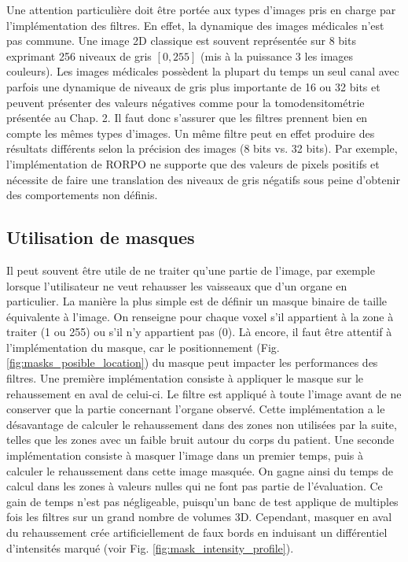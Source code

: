 Une attention particulière doit être portée aux types d'images pris en charge par l'implémentation des filtres. En effet, la dynamique des images médicales n'est pas commune. Une image 2D classique est souvent représentée sur 8 bits exprimant 256 niveaux de gris $[0,255]$ (mis à la puissance 3 les images couleurs). Les images médicales possèdent la plupart du temps un seul canal avec parfois une dynamique de niveaux de gris plus importante de 16 ou 32 bits et peuvent présenter des valeurs négatives comme pour la tomodensitométrie présentée au Chap. 2. Il faut donc s'assurer que les filtres prennent bien en compte les mêmes types d’images. Un même filtre peut en effet produire des résultats différents selon la précision des images (8 bits vs. 32 bits). Par exemple, l'implémentation de RORPO ne supporte que des valeurs de pixels positifs et nécessite de faire une translation des niveaux de gris négatifs sous peine d'obtenir des comportements non définis.

\subsection{Utilisation de masques}

Il peut souvent être utile de ne traiter qu'une partie de l'image, par exemple lorsque l'utilisateur ne veut rehausser les vaisseaux que d'un organe en particulier. La manière la plus simple est de définir un masque binaire de taille équivalente à l'image. On renseigne pour chaque voxel s'il appartient à la zone à traiter (1 ou 255) ou s'il n'y appartient pas (0). Là encore, il faut être attentif à l'implémentation du masque, car le positionnement (Fig. \ref{fig:masks_posible_location}) du masque peut impacter les performances des filtres. Une première implémentation consiste à appliquer le masque sur le rehaussement en aval de celui-ci. Le filtre est appliqué à toute l'image avant de ne conserver que la partie concernant l'organe observé. Cette implémentation a le désavantage de calculer le rehaussement dans des zones non utilisées par la suite, telles que les zones avec un faible bruit autour du corps du patient. Une seconde implémentation consiste à masquer l'image dans un premier temps, puis à calculer le rehaussement dans cette image masquée. On gagne ainsi du temps de calcul dans les zones à valeurs nulles qui ne font pas partie de l'évaluation. Ce gain de temps n'est pas négligeable, puisqu'un banc de test applique de multiples fois les filtres sur un grand nombre de volumes 3D. Cependant, masquer en aval du rehaussement crée artificiellement de faux bords en induisant un différentiel d'intensités marqué (voir Fig. \ref{fig:mask_intensity_profile}).
 
